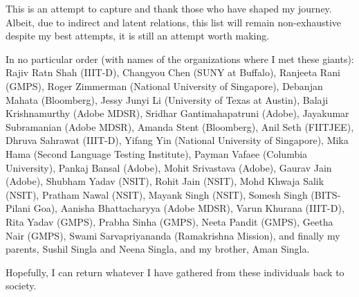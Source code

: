 \documentclass[PhD]{iiitd}
\begin{document}
This is an attempt to capture and thank those who have shaped my journey. Albeit, due to indirect and latent relations, this list will remain non-exhaustive despite my best attempts, it is still an attempt worth making.

In no particular order (with names of the organizations where I met these giants): Rajiv Ratn Shah (IIIT-D), Changyou Chen (SUNY at Buffalo), Ranjeeta Rani (GMPS), Roger Zimmerman (National University of Singapore), Debanjan Mahata (Bloomberg), Jessy Junyi Li (University of Texas at Austin), Balaji Krishnamurthy (Adobe MDSR), Sridhar Gantimahapatruni (Adobe), Jayakumar Subramanian (Adobe MDSR), Amanda Stent (Bloomberg), Anil Seth (FIITJEE), Dhruva Sahrawat (IIIT-D), Yifang Yin (National University of Singapore), Mika Hama (Second Language Testing Institute), Payman Vafaee (Columbia University), Pankaj Bansal (Adobe), Mohit Srivastava (Adobe), Gaurav Jain (Adobe), Shubham Yadav (NSIT), Rohit Jain (NSIT), Mohd Khwaja Salik (NSIT), Pratham Nawal (NSIT), Mayank Singh (NSIT), Somesh Singh (BITS-Pilani Goa), Aanisha Bhattacharyya (Adobe MDSR), Varun Khurana (IIIT-D), Rita Yadav (GMPS), Prabha Sinha (GMPS), Neeta Pandit (GMPS), Geetha Nair (GMPS), Swami Sarvapriyananda (Ramakrishna Mission), and finally my parents, Sushil Singla and Neena Singla, and my brother, Aman Singla.


Hopefully, I can return whatever I have gathered from these individuals back to society.
\clearpage



\clearpage

{\small
\tableofcontents
{}
}

















\iffalse
\listoftables
\clearpage  %
\end{document}

